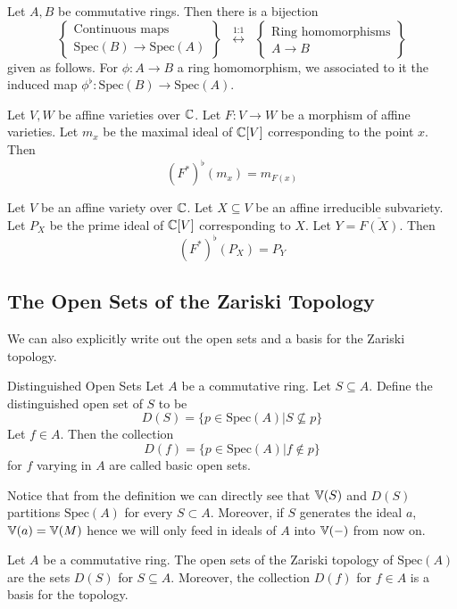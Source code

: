 \documentclass[a4paper]{article}
\begin{document}
\begin{prp}{}{} Let $A,B$ be commutative rings. Then there is a bijection $$\left\{\substack{\text{Continuous maps}\\\text{Spec}(B)\to\text{Spec}(A)}\right\}\;\;\overset{\text{1:1}}{\longleftrightarrow}\;\;\left\{\substack{\text{Ring homomorphisms}\\ A\to B}\right\}$$ given as follows. For $\phi:A\to B$ a ring homomorphism, we associated to it the induced map $\phi^\flat:\text{Spec}(B)\to\text{Spec}(A)$. 
\end{prp}

\begin{prp}{}{} Let $V,W$ be affine varieties over $\mathbb{C}$. Let $F:V\to W$ be a morphism of affine varieties. Let $m_x$ be the maximal ideal of $\mathbb{C}[V]$ corresponding to the point $x$. Then $$(F^\ast)^\flat(m_x)=m_{F(x)}$$
\end{prp}

\begin{prp}{}{} Let $V$ be an affine variety over $\mathbb{C}$. Let $X\subseteq V$ be an affine irreducible subvariety. Let $P_X$ be the prime ideal of $\mathbb{C}[V]$ corresponding to $X$. Let $Y=\overline{F(X)}$. Then $$(F^\ast)^\flat(P_X)=P_Y$$
\end{prp}

\subsection{The Open Sets of the Zariski Topology}
We can also explicitly write out the open sets and a basis for the Zariski topology. 

\begin{defn}{Distinguished Open Sets}{} Let $A$ be a commutative ring. Let $S\subseteq A$. Define the distinguished open set of $S$ to be $$D(S)=\{p\in\text{Spec}(A)|S\not\subseteq p\}$$ Let $f\in A$. Then the collection $$D(f)=\{p\in\text{Spec}(A)|f\notin p\}$$ for $f$ varying in $A$ are called basic open sets. 
\end{defn}

Notice that from the definition we can directly see that $\mathbb{V}(S)$ and $D(S)$ partitions $\text{Spec}(A)$ for every $S\subset A$. Moreover, if $S$ generates the ideal $a$, $\mathbb{V}(a)=\mathbb{V}(M)$ hence we will only feed in ideals of $A$ into $\mathbb{V}(-)$ from now on. 

\begin{thm}{}{} Let $A$ be a commutative ring. The open sets of the Zariski topology of $\text{Spec}(A)$ are the sets $D(S)$ for $S\subseteq A$. Moreover, the collection $D(f)$ for $f\in A$ is a basis for the topology. 
\end{thm}
\end{document}
